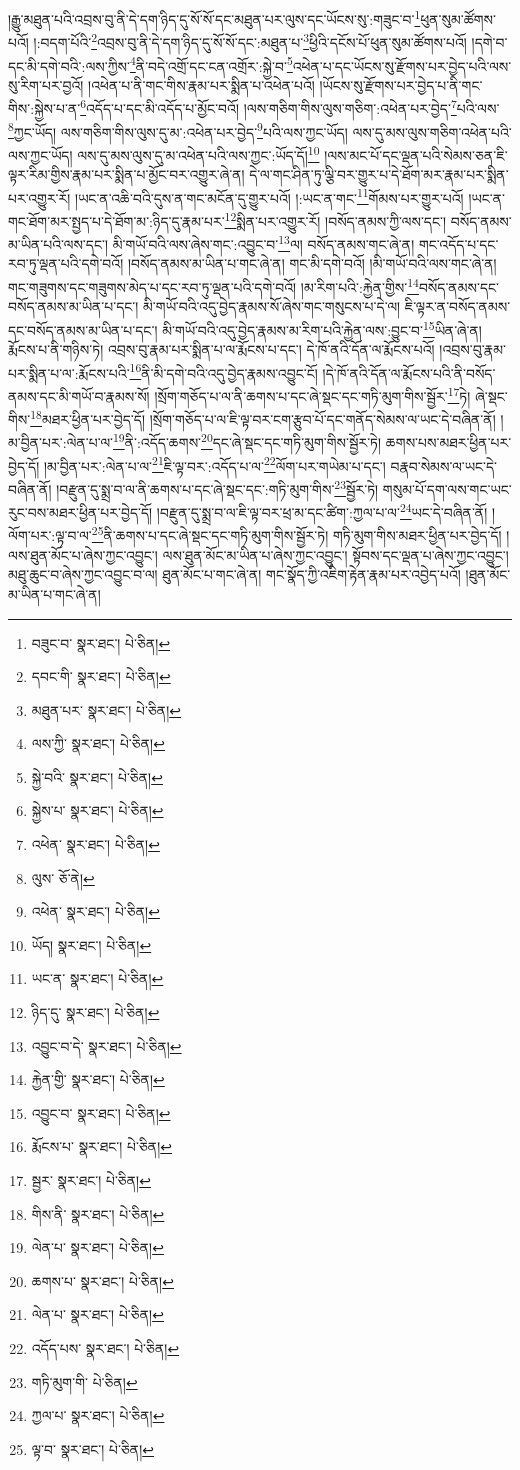 །རྒྱུ་མཐུན་པའི་འབྲས་བུ་ནི་དེ་དག་ཉིད་དུ་སོ་སོ་དང་མཐུན་པར་ལུས་དང་ཡོངས་སུ་:གཟུང་བ་\footnote{བཟུང་བ་  སྣར་ཐང་།  པེ་ཅིན། }ཕུན་སུམ་ཚོགས་པའོ། །:བདག་པོའི་\footnote{དབང་གི་  སྣར་ཐང་།  པེ་ཅིན། }འབྲས་བུ་ནི་དེ་དག་ཉིད་དུ་སོ་སོ་དང་:མཐུན་པ་\footnote{མཐུན་པར་  སྣར་ཐང་།  པེ་ཅིན། }ཕྱིའི་དངོས་པོ་ཕུན་སུམ་ཚོགས་པའོ། །དགེ་བ་དང་མི་དགེ་བའི་:ལས་ཀྱིས་\footnote{ལས་ཀྱི་  སྣར་ཐང་།  པེ་ཅིན། }ནི་བདེ་འགྲོ་དང་ངན་འགྲོར་:སྐྱེ་བ་\footnote{སྐྱེ་བའི་  སྣར་ཐང་།  པེ་ཅིན། }འཕེན་པ་དང་ཡོངས་སུ་རྫོགས་པར་བྱེད་པའི་ལས་སུ་རིག་པར་བྱའོ། །འཕེན་པ་ནི་གང་གིས་རྣམ་པར་སྨིན་པ་འཕེན་པའོ། །ཡོངས་སུ་རྫོགས་པར་བྱེད་པ་ནི་གང་གིས་:སྐྱེས་པ་ན་\footnote{སྐྱེས་པ་  སྣར་ཐང་།  པེ་ཅིན། }འདོད་པ་དང་མི་འདོད་པ་མྱོང་བའོ། །ལས་གཅིག་གིས་ལུས་གཅིག་:འཕེན་པར་བྱེད་\footnote{འཕེན་  སྣར་ཐང་།  པེ་ཅིན། }པའི་ལས་\footnote{ལུས་  ཅོ་ནེ། }ཀྱང་ཡོད། ལས་གཅིག་གིས་ལུས་དུ་མ་:འཕེན་པར་བྱེད་\footnote{འཕེན་  སྣར་ཐང་།  པེ་ཅིན། }པའི་ལས་ཀྱང་ཡོད། ལས་དུ་མས་ལུས་གཅིག་འཕེན་པའི་ལས་ཀྱང་ཡོད། ལས་དུ་མས་ལུས་དུ་མ་འཕེན་པའི་ལས་ཀྱང་:ཡོད་དོ།\footnote{ཡོད།  སྣར་ཐང་།  པེ་ཅིན། } །ལས་མང་པོ་དང་ལྡན་པའི་སེམས་ཅན་ཇི་ལྟར་རིམ་གྱིས་རྣམ་པར་སྨིན་པ་མྱོང་བར་འགྱུར་ཞེ་ན། དེ་ལ་གང་ཤིན་ཏུ་ལྕི་བར་གྱུར་པ་དེ་ཐོག་མར་རྣམ་པར་སྨིན་པར་འགྱུར་རོ། །ཡང་ན་འཆི་བའི་དུས་ན་གང་མངོན་དུ་གྱུར་པའོ། །:ཡང་ན་གང་\footnote{ཡང་ན་  སྣར་ཐང་།  པེ་ཅིན། }གོམས་པར་གྱུར་པའོ། །ཡང་ན་གང་ཐོག་མར་སྤྱད་པ་དེ་ཐོག་མ་:ཉིད་དུ་རྣམ་པར་\footnote{ཉིད་དུ་  སྣར་ཐང་།  པེ་ཅིན། }སྨིན་པར་འགྱུར་རོ། །བསོད་ནམས་ཀྱི་ལས་དང་། བསོད་ནམས་མ་ཡིན་པའི་ལས་དང་། མི་གཡོ་བའི་ལས་ཞེས་གང་:འབྱུང་བ་\footnote{འབྱུང་བ་དེ་  སྣར་ཐང་།  པེ་ཅིན། }ལ། བསོད་ནམས་གང་ཞེ་ན། གང་འདོད་པ་དང་རབ་ཏུ་ལྡན་པའི་དགེ་བའོ། །བསོད་ནམས་མ་ཡིན་པ་གང་ཞེ་ན། གང་མི་དགེ་བའོ། །མི་གཡོ་བའི་ལས་གང་ཞེ་ན། གང་གཟུགས་དང་གཟུགས་མེད་པ་དང་རབ་ཏུ་ལྡན་པའི་དགེ་བའོ། །མ་རིག་པའི་:རྐྱེན་གྱིས་\footnote{རྐྱེན་གྱི་  སྣར་ཐང་།  པེ་ཅིན། }བསོད་ནམས་དང་བསོད་ནམས་མ་ཡིན་པ་དང་། མི་གཡོ་བའི་འདུ་བྱེད་རྣམས་སོ་ཞེས་གང་གསུངས་པ་དེ་ལ། ཇི་ལྟར་ན་བསོད་ནམས་དང་བསོད་ནམས་མ་ཡིན་པ་དང་། མི་གཡོ་བའི་འདུ་བྱེད་རྣམས་མ་རིག་པའི་རྐྱེན་ལས་:བྱུང་བ་\footnote{འབྱུང་བ་  སྣར་ཐང་།  པེ་ཅིན། }ཡིན་ཞེ་ན། རྨོངས་པ་ནི་གཉིས་ཏེ། འབྲས་བུ་རྣམ་པར་སྨིན་པ་ལ་རྨོངས་པ་དང་། དེ་ཁོ་ནའི་དོན་ལ་རྨོངས་པའོ། །འབྲས་བུ་རྣམ་པར་སྨིན་པ་ལ་:རྨོངས་པའི་\footnote{རྨོངས་པ་  སྣར་ཐང་།  པེ་ཅིན། }ནི་མི་དགེ་བའི་འདུ་བྱེད་རྣམས་འབྱུང་ངོ། །དེ་ཁོ་ནའི་དོན་ལ་རྨོངས་པའི་ནི་བསོད་ནམས་དང་མི་གཡོ་བ་རྣམས་སོ། །སྲོག་གཅོད་པ་ལ་ནི་ཆགས་པ་དང་ཞེ་སྡང་དང་གཏི་མུག་གིས་སྦྱོར་\footnote{སྦྱར་  སྣར་ཐང་།  པེ་ཅིན། }ཏེ། ཞེ་སྡང་གིས་\footnote{གིས་ནི་  སྣར་ཐང་།  པེ་ཅིན། }མཐར་ཕྱིན་པར་བྱེད་དོ། །སྲོག་གཅོད་པ་ལ་ཇི་ལྟ་བར་ངག་རྩུབ་པོ་དང་གནོད་སེམས་ལ་ཡང་དེ་བཞིན་ནོ། །མ་བྱིན་པར་:ལེན་པ་ལ་\footnote{ལེན་པ་  སྣར་ཐང་།  པེ་ཅིན། }ནི་:འདོད་ཆགས་\footnote{ཆགས་པ་  སྣར་ཐང་།  པེ་ཅིན། }དང་ཞེ་སྡང་དང་གཏི་མུག་གིས་སྦྱོར་ཏེ། ཆགས་པས་མཐར་ཕྱིན་པར་བྱེད་དོ། །མ་བྱིན་པར་:ལེན་པ་ལ་\footnote{ལེན་པ་  སྣར་ཐང་།  པེ་ཅིན། }ཇི་ལྟ་བར་:འདོད་པ་ལ་\footnote{འདོད་པས་  སྣར་ཐང་།  པེ་ཅིན། }ལོག་པར་གཡེམ་པ་དང་། བརྣབ་སེམས་ལ་ཡང་དེ་བཞིན་ནོ། །བརྫུན་དུ་སྨྲ་བ་ལ་ནི་ཆགས་པ་དང་ཞེ་སྡང་དང་:གཏི་མུག་གིས་\footnote{གཏི་མུག་གི་  པེ་ཅིན། }སྦྱོར་ཏེ། གསུམ་པོ་དག་ལས་གང་ཡང་རུང་བས་མཐར་ཕྱིན་པར་བྱེད་དོ། །བརྫུན་དུ་སྨྲ་བ་ལ་ཇི་ལྟ་བར་ཕྲ་མ་དང་ཚིག་:ཀྱལ་པ་ལ་\footnote{ཀྱལ་པ་  སྣར་ཐང་།  པེ་ཅིན། }ཡང་དེ་བཞིན་ནོ། །ལོག་པར་:ལྟ་བ་ལ་\footnote{ལྟ་བ་  སྣར་ཐང་།  པེ་ཅིན། }ནི་ཆགས་པ་དང་ཞེ་སྡང་དང་གཏི་མུག་གིས་སྦྱོར་ཏེ། གཏི་མུག་གིས་མཐར་ཕྱིན་པར་བྱེད་དོ། །ལས་ཐུན་མོང་པ་ཞེས་ཀྱང་འབྱུང་། ལས་ཐུན་མོང་མ་ཡིན་པ་ཞེས་ཀྱང་འབྱུང་། སྟོབས་དང་ལྡན་པ་ཞེས་ཀྱང་འབྱུང་། མཐུ་ཆུང་བ་ཞེས་ཀྱང་འབྱུང་བ་ལ། ཐུན་མོང་པ་གང་ཞེ་ན། གང་སྣོད་ཀྱི་འཇིག་རྟེན་རྣམ་པར་འབྱེད་པའོ། །ཐུན་མོང་མ་ཡིན་པ་གང་ཞེ་ན། 